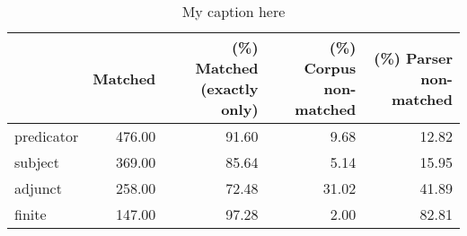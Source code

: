 \begin{table}[!ht]
\centering
\begin{tabular}{lrrrr}
\toprule
{} &  Matched &  (\%) Matched (exactly only) &  (\%) Corpus non-matched &  (\%) Parser non-matched \\
\midrule
predicator &   476.00 &                       91.60 &                    9.68 &                   12.82 \\
subject    &   369.00 &                       85.64 &                    5.14 &                   15.95 \\
adjunct    &   258.00 &                       72.48 &                   31.02 &                   41.89 \\
finite     &   147.00 &                       97.28 &                    2.00 &                   82.81 \\
\bottomrule
\end{tabular}
\caption{My caption here}
\label{tab:unit-elements-mood-relative}
\end{table}